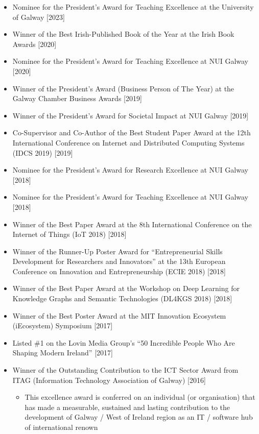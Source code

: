 \documentclass[10pt,a4paper]{res} %
\begin{document}
\begin{resume}
\begin{itemize} \itemsep -2pt
\item Nominee for the President's Award for Teaching Excellence at the University of Galway [2023]
\item Winner of the Best Irish-Published Book of the Year at the Irish Book Awards [2020]
\item Nominee for the President's Award for Teaching Excellence at NUI Galway [2020]
\item Winner of the President's Award (Business Person of The Year) at the Galway Chamber Business Awards [2019]
\item Winner of the President's Award for Societal Impact at NUI Galway [2019]
\item Co-Supervisor and Co-Author of the Best Student Paper Award at the 12th International Conference on Internet and Distributed Computing Systems (IDCS 2019) [2019]
\item Nominee for the President's Award for Research Excellence at NUI Galway [2018]
\item Nominee for the President's Award for Teaching Excellence at NUI Galway [2018]
\item Winner of the Best Paper Award at the 8th International Conference on the Internet of Things (IoT 2018) [2018]
\item Winner of the Runner-Up Poster Award for ``Entrepreneurial Skills Development for Researchers and Innovators'' at the 13th European Conference on Innovation and Entrepreneurship (ECIE 2018) [2018]
\item Winner of the Best Paper Award at the Workshop on Deep Learning for Knowledge Graphs and Semantic Technologies (DL4KGS 2018) [2018]
\item Winner of the Best Poster Award at the MIT Innovation Ecosystem (iEcosystem) Symposium [2017]
\item Listed \#1 on the Lovin Media Group's ``50 Incredible People Who Are Shaping Modern Ireland'' [2017]
\item Winner of the Outstanding Contribution to the ICT Sector Award from ITAG (Information Technology Association of Galway) [2016]
\begin{itemize} \itemsep -2pt
\item This excellence award is conferred on an individual (or organisation) that has made a measurable, sustained and lasting contribution to the development of Galway / West of Ireland region as an IT / software hub of international renown
\end{itemize}

\end{itemize}
\end{resume}
\end{document}
